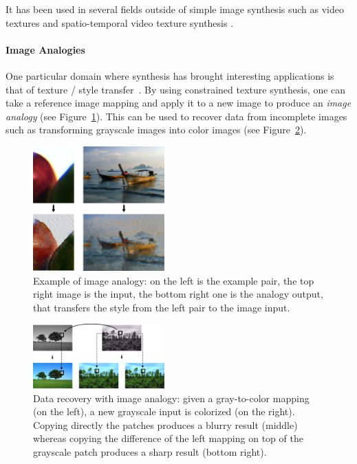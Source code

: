 It has been used in several fields outside of simple image synthesis \cite{Wei09} such as video textures \cite{Schodl00, Schodl02, Agarwala05} and spatio-temporal video texture synthesis \cite{Kwatra03, Wexler07}.

\paragraph{Image Analogies}
One particular domain where synthesis has brought interesting applications is that of texture / style transfer~\cite{Efros01, Hertzmann01}. By using constrained texture synthesis, one can take a reference image mapping and apply it to a new image to produce an \emph{image analogy} (see Figure~\ref{fig:analogies}). This can be used to recover data from incomplete images such as transforming grayscale images into color images (see Figure~\ref{fig:colorize}).

\begin{figure}[ht]
	\center
	\includegraphics[width=0.45\textwidth]{figures/analogies}
	\caption{Example of image analogy: on the left is the example pair, the top right image is the input, the bottom right one is the analogy output, that transfers the style from the left pair to the image input.}
	\label{fig:analogies}
\end{figure}

\begin{figure}[ht]
	\center
	\includegraphics[width=0.45\textwidth]{figures/colorization}
	\caption{Data recovery with image analogy: given a gray-to-color mapping (on the left), a new grayscale input is colorized (on the right). Copying directly the patches produces a blurry result (middle) whereas copying the difference of the left mapping on top of the grayscale patch produces a sharp result (bottom right).}
	\label{fig:colorize}
\end{figure}

